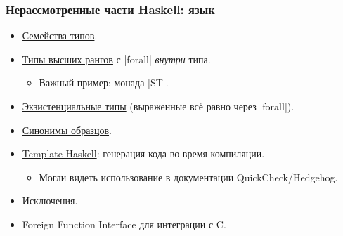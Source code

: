 \documentclass[11pt]{beamer}
\begin{document}
\begin{frame}[fragile]
  \frametitle{Нерассмотренные части Haskell: язык}
  \begin{itemize}
    \item \href{https://downloads.haskell.org/~ghc/latest/docs/html/users_guide/glasgow_exts.html#type-families}{Семейства типов}.
    \item \href{https://downloads.haskell.org/~ghc/latest/docs/html/users_guide/glasgow_exts.html#arbitrary-rank-polymorphism}{Типы высших рангов} с \haskinline|forall| \emph{внутри} типа.
          \begin{itemize}
            \item Важный пример: монада \haskinline|ST|.
          \end{itemize}
    \item \href{https://downloads.haskell.org/~ghc/latest/docs/html/users_guide/glasgow_exts.html#existentially-quantified-data-constructors}{Экзистенциальные типы} (выраженные всё равно через \haskinline|forall|).
    \item \href{https://downloads.haskell.org/~ghc/latest/docs/html/users_guide/glasgow_exts.html#pattern-synonyms}{Синонимы образцов}.
    \item \href{https://downloads.haskell.org/~ghc/latest/docs/html/users_guide/glasgow_exts.html#template-haskell}{Template Haskell}: генерация кода во время компиляции.
          \begin{itemize}
            \item Могли видеть использование в документации QuickCheck/Hedgehog.
          \end{itemize}
    \item Исключения.
    \item Foreign Function Interface для интеграции с C.
  \end{itemize}
\end{frame}
\end{document}
